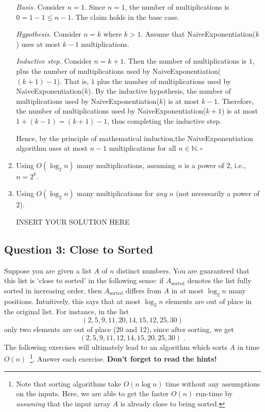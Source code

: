 \begin{enumerate}
\begin{solution}
\textit{Basis. }Consider $n=1$. Since $n=1$, the number of multiplications is $0=1-1\leq n-1$. The claim holds in the base case.

\textit{Hypothesis. }Consider $n=k$ where $k>1$. Assume that {\sc NaiveExponentiation}($k$) uses at most $k-1$ multiplications.

\textit{Inductive step. }Consider $n=k+1$. Then the number of multiplications is $1$, plus the number of multiplications used by {\sc NaiveExponentiation}($(k+1)-1$). That is, $1$ plus the number of multiplications used by {\sc NaiveExponentiation}($k$). By the inductive hypothesis, the number of multiplications used by {\sc NaiveExponentiation}($k$) is at most $k-1$. Therefore, the number of multiplications used by {\sc NaiveExponentiation}($k+1$) is at most $1+(k-1)=(k+1)-1$, thus completing the inductive step.

Hence, by the principle of mathematical induction,the {\sc NaiveExponentiation} algorithm uses at most $n-1$ multiplications for all $n\in\mathbb{N}$.$~\square$
\textit{}
\end{solution}    
    \item Using $O(\log_2 n)$ many multiplications, assuming $n$ is a power of $2$, i.e., $n=2^k$.
\begin{solution}

\end{solution}
    
    \item Using $O(\log_2 n)$ many multiplications for \emph{any} $n$ (not necessarily a power of $2$).
\begin{solution}   INSERT YOUR SOLUTION HERE   \end{solution}
\end{enumerate}
\subsection*{Question 3: Close to Sorted}
Suppose you are given a list $A$ of $n$ distinct numbers. You are guaranteed that this list is `close to sorted' in the following sense: if $A_{\text{sorted}}$ denotes the list fully sorted in increasing order, then $A_{\text{sorted}}$ differs from $A$ in at most $\log_2 n$ many positions. Intuitively, this says that at most $\log_2 n$ elements are out of place in the original list. For instance, in the list 
\[
(2,5,9,11,20,14,15,12,25,30)
\]
only two elements are out of place (20 and 12), since after sorting, we get 
\[
(2,5,9,11,12,14,15,20,25,30) \;.
\]
The following exercises will ultimately lead to an algorithm which sorts $A$ in time $O(n)$~\footnote{Note that sorting algorithms take $O(n\log n)$ time without any assumptions on the inputs. Here, we are able to get the faster $O(n)$ run-time by \emph{assuming} that the input array $A$ is already close to being sorted.}. Answer each exercise. \textbf{Don't forget to read the hints!}

